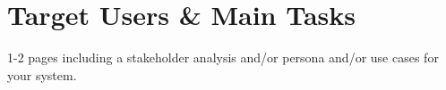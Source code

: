 \documentclass[requirements.tex]{subfiles}
\begin{document}
\section{Target Users \& Main Tasks} %
\label{sec:target_users_main_tasks}

1-2 pages including a stakeholder analysis and/or persona and/or use cases for
your system.

\newpage
\end{document}
